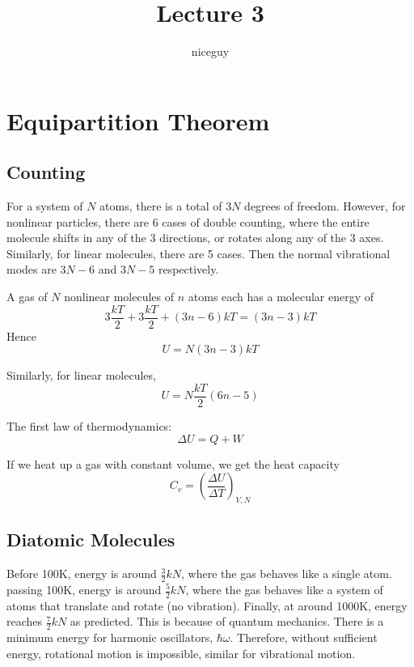 \documentclass[12pt]{article}
\author{niceguy}
\title{Lecture 3}
\begin{document}
\maketitle

\section{Equipartition Theorem}

\subsection{Counting}

For a system of $N$ atoms, there is a total of $3N$ degrees of freedom. However, for nonlinear particles, there are 6 cases of double counting, where the entire molecule shifts in any of the 3 directions, or rotates along any of the 3 axes. Similarly, for linear molecules, there are 5 cases. Then the normal vibrational modes are $3N-6$ and $3N-5$ respectively.

A gas of $N$ nonlinear molecules of $n$ atoms each has a molecular energy of
$$3\frac{kT}{2} + 3\frac{kT}{2} + (3n-6)kT = (3n-3)kT$$
Hence
$$U = N(3n-3)kT$$

Similarly, for linear molecules,
$$U = N\frac{kT}{2}(6n-5)$$

The first law of thermodynamics:
$$\Delta U = Q + W$$

If we heat up a gas with constant volume, we get the heat capacity
$$C_v = \left(\frac{\Delta U}{\Delta T}\right)_{V,N}$$

\subsection{Diatomic Molecules}

Before 100K, energy is around $\frac{3}{2}kN$, where the gas behaves like a single atom. passing 100K, energy is around $\frac{5}{2}kN$, where the gas behaves like a system of atoms that translate and rotate (no vibration). Finally, at around 1000K, energy reaches $\frac{7}{2}kN$ as predicted. This is because of quantum mechanics. There is a minimum energy for harmonic oscillators, $\hbar\omega$. Therefore, without sufficient energy, rotational motion is impossible, similar for vibrational motion.
\end{document}
